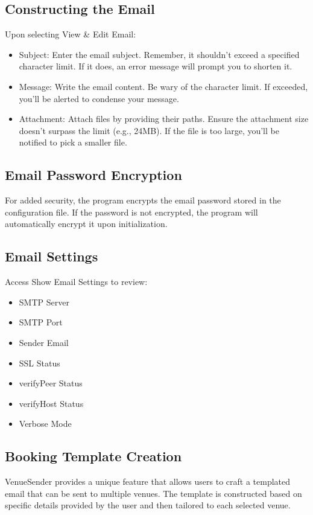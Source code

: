 \documentclass{article}
\begin{document}
	\subsection*{Constructing the Email}
	Upon selecting View \& Edit Email:
	\begin{itemize}
		\item Subject: Enter the email subject. Remember, it shouldn't exceed a specified character limit. If it does, an error message will prompt you to shorten it.
		\item Message: Write the email content. Be wary of the character limit. If exceeded, you'll be alerted to condense your message.
		\item Attachment: Attach files by providing their paths. Ensure the attachment size doesn't surpass the limit (e.g., 24MB). If the file is too large, you'll be notified to pick a smaller file.
	\end{itemize}
	
	\subsection*{Email Password Encryption}
	For added security, the program encrypts the email password stored in the configuration file. If the password is not encrypted, the program will automatically encrypt it upon initialization. 
	
	\subsection*{Email Settings}
	Access Show Email Settings to review:
	\begin{itemize}
		\item SMTP Server
		\item SMTP Port
		\item Sender Email
		\item SSL Status
		\item verifyPeer Status
		\item verifyHost Status
		\item Verbose Mode
	\end{itemize}
	
	\subsection*{Booking Template Creation}
	VenueSender provides a unique feature that allows users to craft a templated email that can be sent to multiple venues. The template is constructed based on specific details provided by the user and then tailored to each selected venue.
	
\end{document}
